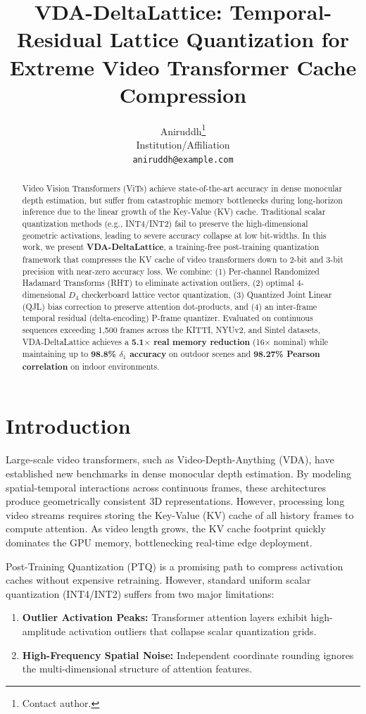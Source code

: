 \documentclass[10pt,twocolumn,letterpaper]{article}
\title{VDA-DeltaLattice: Temporal-Residual Lattice Quantization for Extreme Video Transformer Cache Compression}
\author{Aniruddh\thanks{Contact author.} \\
Institution/Affiliation \\
{\tt\small aniruddh@example.com}
}
\begin{document}
\maketitle

\begin{abstract}
Video Vision Transformers (ViTs) achieve state-of-the-art accuracy in dense monocular depth estimation, but suffer from catastrophic memory bottlenecks during long-horizon inference due to the linear growth of the Key-Value (KV) cache. Traditional scalar quantization methods (e.g., INT4/INT2) fail to preserve the high-dimensional geometric activations, leading to severe accuracy collapse at low bit-widths. In this work, we present \textbf{VDA-DeltaLattice}, a training-free post-training quantization framework that compresses the KV cache of video transformers down to 2-bit and 3-bit precision with near-zero accuracy loss. We combine: (1) Per-channel Randomized Hadamard Transforms (RHT) to eliminate activation outliers, (2) optimal 4-dimensional $D_4$ checkerboard lattice vector quantization, (3) Quantized Joint Linear (QJL) bias correction to preserve attention dot-products, and (4) an inter-frame temporal residual (delta-encoding) P-frame quantizer. Evaluated on continuous sequences exceeding 1,500 frames across the KITTI, NYUv2, and Sintel datasets, VDA-DeltaLattice achieves a \textbf{5.1$\times$ real memory reduction} (16$\times$ nominal) while maintaining up to \textbf{98.8\% $\delta_1$ accuracy} on outdoor scenes and \textbf{98.27\% Pearson correlation} on indoor environments.
\end{abstract}

\section{Introduction}
Large-scale video transformers, such as Video-Depth-Anything (VDA), have established new benchmarks in dense monocular depth estimation. By modeling spatial-temporal interactions across continuous frames, these architectures produce geometrically consistent 3D representations. However, processing long video streams requires storing the Key-Value (KV) cache of all history frames to compute attention. As video length grows, the KV cache footprint quickly dominates the GPU memory, bottlenecking real-time edge deployment.

Post-Training Quantization (PTQ) is a promising path to compress activation caches without expensive retraining. However, standard uniform scalar quantization (INT4/INT2) suffers from two major limitations:
\begin{enumerate}
    \item \textbf{Outlier Activation Peaks:} Transformer attention layers exhibit high-amplitude activation outliers that collapse scalar quantization grids.
    \item \textbf{High-Frequency Spatial Noise:} Independent coordinate rounding ignores the multi-dimensional structure of attention features.
\end{enumerate}
\end{document}
